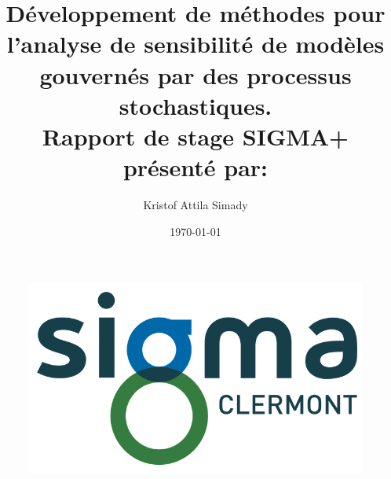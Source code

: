\documentclass[a4paper,10pt]{article}
\begin{document}
%  

	
   \title{{\Huge Développement de méthodes pour l'analyse de sensibilité de modèles gouvernés par des processus stochastiques.
   	}\\[2cm]{\Large Rapport de stage SIGMA+}\\[0.5cm]{\Large présenté par:}}
	
   \author{{\LARGE Kristof Attila Simady}}
   
   \date{\today}

	\begin{titlepage}
		\begin{figure}[!t]
			\vspace{-3cm} \hspace{8cm}
			\includegraphics[scale = 0.25]{Logo_SIGMA_Clermont.png}
			\vspace{1cm}
    	\end{figure}
    	
    	\center
    
    	\textbf{\thetitle}
    	\vspace{2cm}
    
    	\textbf{\theauthor}
		

\end{titlepage}
\end{document}
